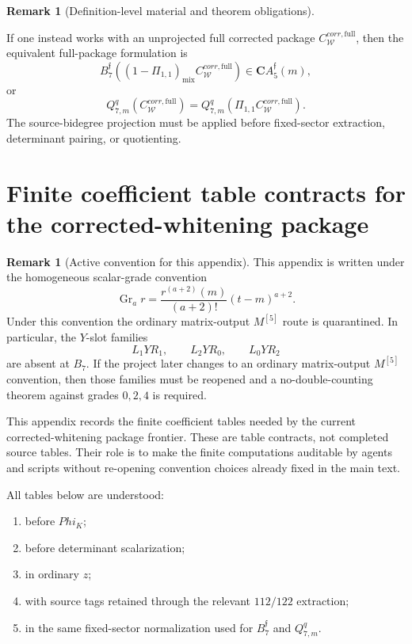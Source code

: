 \documentclass[11pt,a4paper]{amsart}
\def\Phi{Phi}%
\def\corr{corr}%
\theoremstyle{plain}
\theoremstyle{definition}
\newtheorem{remark}[theorem]{Remark}
\newcommand{\corr}{\mathrm{corr}}
\begin{document}
\begin{remark}[Definition-level material and theorem obligations]
\begin{enumerate}
If one instead works with an unprojected full corrected package
\(C_{\mathcal W}^{\corr,\mathrm{full}}\), then the equivalent full-package
formulation is
\[
B_7^{\mathfrak f}
\left(
(1-\Pi_{1,1})_{\mathrm{mix}}
C_{\mathcal W}^{\corr,\mathrm{full}}
\right)
\in
\mathbf C A_5^{\mathfrak f}(m),
\]
or
\[
Q_{7,m}^q(C_{\mathcal W}^{\corr,\mathrm{full}})
=
Q_{7,m}^q(\Pi_{1,1}C_{\mathcal W}^{\corr,\mathrm{full}}).
\]
The source-bidegree projection must be applied before fixed-sector
extraction, determinant pairing, or quotienting.
\end{enumerate}
\end{remark}

\section{Finite coefficient table contracts for the corrected-whitening package}
\label{app:finite-coefficient-table-contracts}

\begin{remark}[Active convention for this appendix]
\label{rem:active-convention-finite-coefficient-appendix}
This appendix is written under the homogeneous scalar-grade convention
\[
\operatorname{Gr}_a r
=
\frac{r^{(a+2)}(m)}{(a+2)!}(t-m)^{a+2}.
\]
Under this convention the ordinary matrix-output \(M^{[5]}\) route is
quarantined.  In particular, the \(Y\)-slot families
\[
L_1YR_1,\qquad L_2YR_0,\qquad L_0YR_2
\]
are absent at \(B_7\).  If the project later changes to an ordinary
matrix-output \(M^{[5]}\) convention, then those families must be reopened
and a no-double-counting theorem against grades \(0,2,4\) is required.
\end{remark}

This appendix records the finite coefficient tables needed by the current
corrected-whitening package frontier.  These are table contracts, not
completed source tables.  Their role is to make the finite computations
auditable by agents and scripts without re-opening convention choices
already fixed in the main text.

All tables below are understood:
\begin{enumerate}
\item before \(\Phi_K\);
\item before determinant scalarization;
\item in ordinary \(z\);
\item with source tags retained through the relevant \(112/122\) extraction;
\item in the same fixed-sector normalization used for
\(B_7^{\mathfrak f}\) and \(Q_{7,m}^q\).
\end{enumerate}
\end{document}

